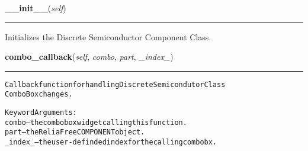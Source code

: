     \label{reliafree:semiconductors:semiconductor:Semiconductor:__init__}

    \vspace{0.5ex}

\hspace{.8\funcindent}\begin{boxedminipage}{\funcwidth}

    \raggedright \textbf{\_\_init\_\_}(\textit{self})

    \vspace{-1.5ex}

    \rule{\textwidth}{0.5\fboxrule}
\setlength{\parskip}{2ex}
    Initializes the Discrete Semiconductor Component Class.

\setlength{\parskip}{1ex}
    \end{boxedminipage}

    \label{reliafree:semiconductors:semiconductor:Semiconductor:combo_callback}

    \vspace{0.5ex}

\hspace{.8\funcindent}\begin{boxedminipage}{\funcwidth}

    \raggedright \textbf{combo\_callback}(\textit{self}, \textit{combo}, \textit{part}, \textit{\_index\_})

    \vspace{-1.5ex}

    \rule{\textwidth}{0.5\fboxrule}
\setlength{\parskip}{2ex}
\begin{alltt}
Callback function for handling Discrete Semicondutor Class
ComboBox changes.

Keyword Arguments:
  combo -- the combobox widget calling this function.
   part -- the ReliaFree COMPONENT object.
\_index\_ -- the user-definded index for the calling combobx.
\end{alltt}

\setlength{\parskip}{1ex}
    \end{boxedminipage}

